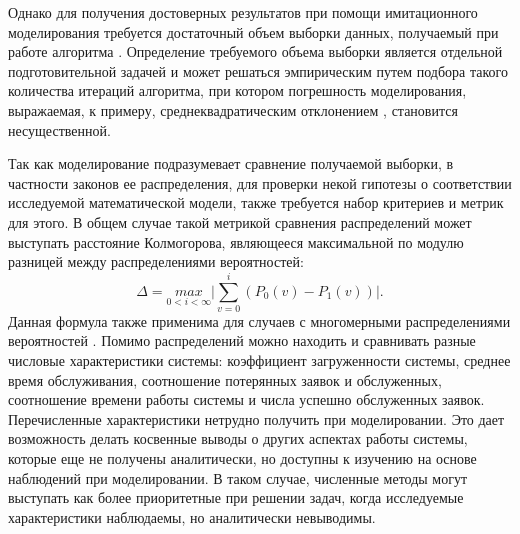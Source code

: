 Однако для получения достоверных результатов при помощи имитационного моделирования требуется достаточный объем выборки данных, получаемый при работе алгоритма \cite{лобач2004имитационное,моисеев2016исследование}. Определение требуемого объема выборки является отдельной подготовительной задачей и может решаться эмпирическим путем подбора такого количества итераций алгоритма, при котором погрешность моделирования, выражаемая, к примеру, среднеквадратическим отклонением \cite{алиев2013погрешности}, становится несущественной.

Так как моделирование подразумевает сравнение получаемой выборки, в частности законов ее распределения, для проверки некой гипотезы о соответствии исследуемой математической модели, также требуется набор критериев и метрик для этого. В общем случае такой метрикой сравнения распределений может выступать расстояние Колмогорова, являющееся максимальной по модулю разницей между распределениями вероятностей:
\begin{equation}\label{kdistance}
	\Delta = \underset{0 < i < \infty}{max}\bigg\rvert \sum_{v=0}^{i} (P_0(v) - P_1(v))\bigg\rvert.
\end{equation}
Данная формула также применима для случаев с многомерными распределениями вероятностей \cite{fasano1987multidimensional}. Помимо распределений можно находить и сравнивать разные числовые характеристики системы: коэффициент загруженности системы, среднее время обслуживания, соотношение потерянных заявок и обслуженных, соотношение времени работы системы и числа успешно обслуженных заявок. Перечисленные характеристики нетрудно получить при моделировании. Это дает возможность делать косвенные выводы о других аспектах работы системы, которые еще не получены аналитически, но доступны к изучению на основе наблюдений при моделировании. В таком случае, численные методы могут выступать как более приоритетные при решении задач, когда исследуемые характеристики наблюдаемы, но аналитически невыводимы.
\clearpage